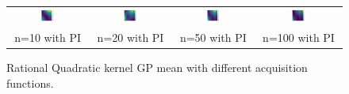 \documentclass[11pt]{article}
\begin{document}
\begin{figure}[H]
\begin{tabular}{cccc}
        \includegraphics[width=0.225\textwidth]{../Task-02/plots/gp_mean_rational_quadratic_n10_PI.png} &
        \includegraphics[width=0.225\textwidth]{../Task-02/plots/gp_mean_rational_quadratic_n20_PI.png} &
        \includegraphics[width=0.225\textwidth]{../Task-02/plots/gp_mean_rational_quadratic_n50_PI.png} &
        \includegraphics[width=0.225\textwidth]{../Task-02/plots/gp_mean_rational_quadratic_n100_PI.png} \\
        n=10 with PI & n=20 with PI & n=50 with PI & n=100 with PI \\
    \end{tabular}
    \caption{Rational Quadratic kernel GP mean with different acquisition functions.}
    \label{fig:rational_quadratic_gp_mean}
\end{figure}
\end{document}
